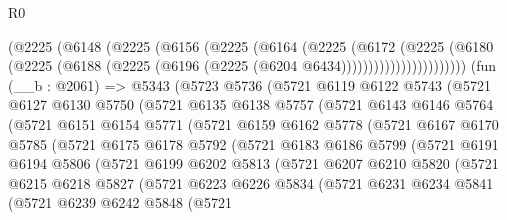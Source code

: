 \begin{lexlean}{R0}
\begin{coremodule}
                  (@2225
                    (@6148
                      (@2225
                        (@6156
                          (@2225
                            (@6164
                              (@2225
                                (@6172
                                  (@2225
                                    (@6180
                                      (@2225
                                        (@6188
                                          (@2225 (@6196 (@2225 (@6204 @6434)))))))))))))))))))))))
    (fun (__b : @2061) =>
    @5343
      (@5723
        @5736
        (@5721
          @6119
          @6122
          @5743
          (@5721
            @6127
            @6130
            @5750
            (@5721
              @6135
              @6138
              @5757
              (@5721
                @6143
                @6146
                @5764
                (@5721
                  @6151
                  @6154
                  @5771
                  (@5721
                    @6159
                    @6162
                    @5778
                    (@5721
                      @6167
                      @6170
                      @5785
                      (@5721
                        @6175
                        @6178
                        @5792
                        (@5721
                          @6183
                          @6186
                          @5799
                          (@5721
                            @6191
                            @6194
                            @5806
                            (@5721
                              @6199
                              @6202
                              @5813
                              (@5721
                                @6207
                                @6210
                                @5820
                                (@5721
                                  @6215
                                  @6218
                                  @5827
                                  (@5721
                                    @6223
                                    @6226
                                    @5834
                                    (@5721
                                      @6231
                                      @6234
                                      @5841
                                      (@5721
                                        @6239
                                        @6242
                                        @5848
                                        (@5721

\end{coremodule}
\end{lexlean}
